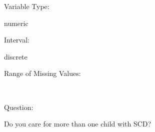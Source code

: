 \documentclass[
]{article}
\begin{document}
\begin{minipage}[t]{0.3\linewidth}

Variable Type:

\end{minipage}%
\begin{minipage}[t]{0.7\linewidth}

numeric

\end{minipage}

\begin{minipage}[t]{0.3\linewidth}

Interval:

\end{minipage}%
\begin{minipage}[t]{0.7\linewidth}

discrete

\end{minipage}

\begin{minipage}[t]{0.3\linewidth}

Range of Missing Values:

\end{minipage}%
\begin{minipage}[t]{0.7\linewidth}

~

\end{minipage}

\begin{minipage}[t]{0.3\linewidth}

Question:

\end{minipage}%
\begin{minipage}[t]{0.7\linewidth}

Do you care for more than one child with SCD?

\end{minipage}
\end{document}
